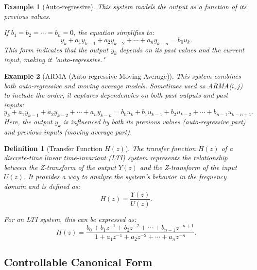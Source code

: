 \documentclass[a4 paper]{article}
\numberwithin{equation}{section}
\theoremstyle{boldStyle}
\theoremstyle{boldBlueStyle}
\theoremstyle{boldPurpleStyle}
\theoremstyle{boldRedStyle}
\newtheorem{definition}{Definition}[section]
\theoremstyle{boldGreenStyle}
\newtheorem{example}{Example}[section]
\begin{document}
\begin{example}[Auto-regressive]
  This system models the output as a function of its previous values. 

  If \( b_1 = b_2 = \cdots = b_n = 0 \), the equation simplifies to:
  \[
  y_k + a_1 y_{k-1} + a_2 y_{k-2} + \cdots + a_n y_{k-n} = b_0 u_k.
  \]
  This form indicates that the output \( y_k \) depends on its past values and the current input, making it "auto-regressive."
\end{example}
  
\begin{example}[ARMA (Auto-regressive Moving Average)]
  This system combines both auto-regressive and moving average models. 
  Sometimes used as ARMA(\(i,j\)) to include the order, it captures dependencies on both past outputs and past inputs:
  \[
  y_k + a_1 y_{k-1} + a_2 y_{k-2} + \cdots + a_n y_{k-n} = b_0 u_k + b_1 u_{k-1} + b_2 u_{k-2} + \cdots + b_{n-1} u_{k-n+1}.
  \]
  Here, the output \( y_k \) is influenced by both its previous values (auto-regressive part) and previous inputs (moving average part).
\end{example}


\begin{definition}[Transfer Function \( H(z) \)]
  The transfer function \( H(z) \) of a discrete-time linear time-invariant (LTI) system represents the relationship between the Z-transform of the output \( Y(z) \) and the Z-transform of the input \( U(z) \). It provides a way to analyze the system's behavior in the frequency domain and is defined as:
  \[
  H(z) = \frac{Y(z)}{U(z)}.
  \]

  For an LTI system, this can be expressed as:
  \[
  H(z) = \frac{b_0 + b_1 z^{-1} + b_2 z^{-2} + \cdots + b_{n-1} z^{-n+1}}{1 + a_1 z^{-1} + a_2 z^{-2} + \cdots + a_n z^{-n}}.
  \]
\end{definition}


\subsection{Controllable Canonical Form}
\end{document}
